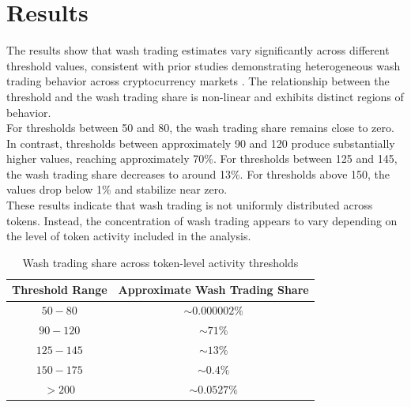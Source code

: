 \documentclass[language=english,thesis=bachelor,nosecondtitle,faculty=cb,onesided,13pt]{hsmw-thesis}
\begin{document}
	\section{Results}
The results show that wash trading estimates vary significantly across different threshold values, consistent with prior studies demonstrating heterogeneous wash trading behavior across cryptocurrency markets \cite{victor2021detecting, cui2023chain}. The relationship between the threshold and the wash trading share is non-linear and exhibits distinct regions of behavior.\\
For thresholds between 50 and 80, the wash trading share remains close to zero. In contrast, thresholds between approximately 90 and 120 produce substantially higher values, reaching approximately 70\%. For thresholds between 125 and 145, the wash trading share decreases to around 13\%. For thresholds above 150, the values drop below 1\% and stabilize near zero.\\
These results indicate that wash trading is not uniformly distributed across tokens. Instead, the concentration of wash trading appears to vary depending on the level of token activity included in the analysis.
\begin{table}[h!]
\centering
\begin{tabular}{cc}
	\hline
	\textbf{Threshold Range} & \textbf{Approximate Wash Trading Share} \\ \hline
	$50-80$    & $\sim 0.000002\%$ \\ 
	$90-120$   & $\sim 71\%$       \\ 
	$125-145$  & $\sim 13\%$       \\ 
	$150-175$  & $\sim 0.4\%$      \\ 
	$>200$      & $\sim 0.0527\%$   \\ \hline
\end{tabular}
\caption{Wash trading share across token-level activity thresholds}
\label{table:wash_trading_shares}
\end{table}
\end{document}
